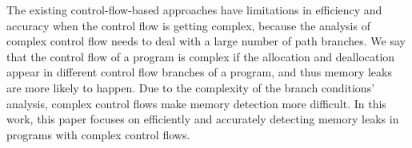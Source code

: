 The existing control-flow-based approaches have limitations in efficiency and accuracy when the control flow is getting complex, because the analysis of complex control flow needs to deal with a large number of path branches. %
We say that the control flow of a program is complex if the allocation and deallocation appear in different control flow branches of a program, and thus memory leaks are more likely to happen. Due to the complexity of the branch conditions' analysis, complex control flows make memory detection more difficult. %
In this work, this paper focuses on efficiently and accurately detecting memory leaks in programs with complex control flows.  

